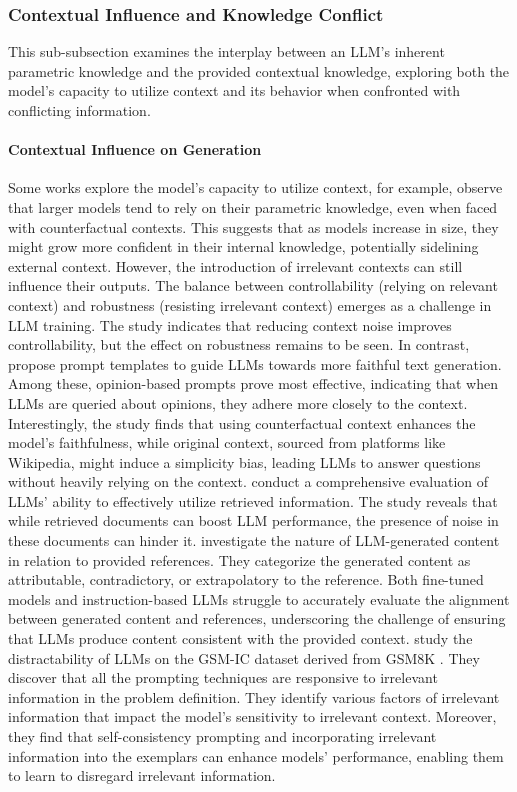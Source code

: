 \subsubsection{Contextual Influence and Knowledge Conflict}
\label{sec:analy_confict}

This sub-subsection examines the interplay between an LLM's inherent parametric knowledge and the provided contextual knowledge, exploring both the model's capacity to utilize context and its behavior when confronted with conflicting information.

\paragraph{Contextual Influence on Generation}
Some works explore the model's capacity to utilize context, for example, \citet{li-etal-2023-large} observe that larger models tend to rely on their parametric knowledge, even when faced with counterfactual contexts. This suggests that as models increase in size, they might grow more confident in their internal knowledge, potentially sidelining external context. However, the introduction of irrelevant contexts can still influence their outputs. The balance between controllability (relying on relevant context) and robustness (resisting irrelevant context) emerges as a challenge in LLM training. The study indicates that reducing context noise improves controllability, but the effect on robustness remains to be seen.
In contrast, \citet{zhou2023context} propose prompt templates to guide LLMs towards more faithful text generation. Among these, opinion-based prompts prove most effective, indicating that when LLMs are queried about opinions, they adhere more closely to the context. Interestingly, the study finds that using counterfactual context enhances the model's faithfulness, while original context, sourced from platforms like Wikipedia, might induce a simplicity bias, leading LLMs to answer questions without heavily relying on the context.
\citet{chen2023benchmarking} conduct a comprehensive evaluation of LLMs' ability to effectively utilize retrieved information. The study reveals that while retrieved documents can boost LLM performance, the presence of noise in these documents can hinder it.
\citet{yue2023automatic} investigate the nature of LLM-generated content in relation to provided references. They categorize the generated content as attributable, contradictory, or extrapolatory to the reference. Both fine-tuned models and instruction-based LLMs struggle to accurately evaluate the alignment between generated content and references, underscoring the challenge of ensuring that LLMs produce content consistent with the provided context.
\citet{shi2023large} study the distractability of LLMs on the GSM-IC dataset derived from GSM8K \citep{cobbe2021training}. They discover that all the prompting techniques are responsive to irrelevant information in the problem definition. They identify various factors of irrelevant information that impact the model's sensitivity to irrelevant context. Moreover, they find that self-consistency prompting and incorporating irrelevant information into the exemplars can enhance models' performance, enabling them to learn to disregard irrelevant information.


